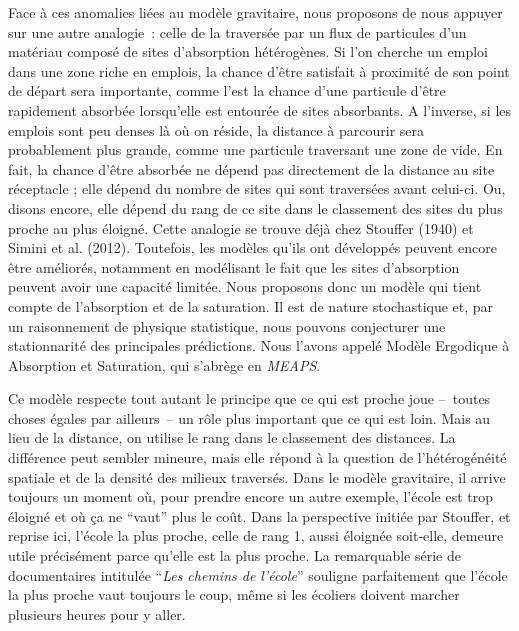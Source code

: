 \documentclass[
  10pt,
  a4paper,
  numbers=noendperiod,
  DIV=9]{scrartcl}
\begin{document}
Face à ces anomalies liées au modèle gravitaire, nous proposons de nous
appuyer sur une autre analogie~: celle de la traversée par un flux de
particules d'un matériau composé de sites d'absorption hétérogènes. Si
l'on cherche un emploi dans une zone riche en emplois, la chance d'être
satisfait à proximité de son point de départ sera importante, comme
l'est la chance d'une particule d'être rapidement absorbée lorsqu'elle
est entourée de sites absorbants. A l'inverse, si les emplois sont peu
denses là où on réside, la distance à parcourir sera probablement plus
grande, comme une particule traversant une zone de vide. En fait, la
chance d'être absorbée ne dépend pas directement de la distance au site
réceptacle ; elle dépend du nombre de sites qui sont traversées avant
celui-ci. Ou, disons encore, elle dépend du rang de ce site dans le
classement des sites du plus proche au plus éloigné. Cette analogie se
trouve déjà chez Stouffer (1940) et Simini et al. (2012). Toutefois, les
modèles qu'ils ont développés peuvent encore être améliorés, notamment
en modélisant le fait que les sites d'absorption peuvent avoir une
capacité limitée. Nous proposons donc un modèle qui tient compte de
l'absorption et de la saturation. Il est de nature stochastique et, par
un raisonnement de physique statistique, nous pouvons conjecturer une
stationnarité des principales prédictions. Nous l'avons appelé Modèle
Ergodique à Absorption et Saturation, qui s'abrège en \emph{MEAPS}.

Ce modèle respecte tout autant le principe que ce qui est proche joue
--~toutes choses égales par ailleurs~-- un rôle plus important que ce
qui est loin. Mais au lieu de la distance, on utilise le rang dans le
classement des distances. La différence peut sembler mineure, mais elle
répond à la question de l'hétérogénéité spatiale et de la densité des
milieux traversés. Dans le modèle gravitaire, il arrive toujours un
moment où, pour prendre encore un autre exemple, l'école est trop
éloigné et où ça ne ``vaut'' plus le coût. Dans la perspective initiée
par Stouffer, et reprise ici, l'école la plus proche, celle de rang 1,
aussi éloignée soit-elle, demeure utile précisément parce qu'elle est la
plus proche. La remarquable série de documentaires intitulée ``\emph{Les
chemins de l'école}'' souligne parfaitement que l'école la plus proche
vaut toujours le coup, même si les écoliers doivent marcher plusieurs
heures pour y aller.
\end{document}
